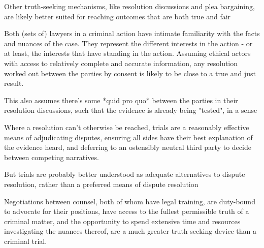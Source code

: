 Other truth-seeking mechanisms, like resolution discussions and plea bargaining, are likely better suited for reaching outcomes that are both true and fair

Both (sets of) lawyers in a criminal action have intimate familiarity with the facts and nuances of the case. They represent the different interests in the action - or at least, the interests that have standing in the action. Assuming ethical actors with access to relatively complete and accurate information, any resolution worked out between the parties by consent is likely to be close to a true and just result.

This also assumes there's some *quid pro quo* between the parties in their resolution discussions, such that the evidence is already being "tested", in a sense

Where a resolution can't otherwise be reached, trials are a reasonably effective means of adjudicating disputes, ensuring all sides have their best explanation of the evidence heard, and deferring to an ostensibly neutral third party to decide between competing narratives.

But trials are probably better understood as adequate alternatives to dispute resolution, rather than a preferred means of dispute resolution

Negotiations between counsel, both of whom have legal training, are duty-bound to advocate for their positions, have access to the fullest permissible truth of a criminal matter, and the opportunity to spend extensive time and resources investigating the nuances thereof, are a much greater truth-seeking device than a criminal trial.
